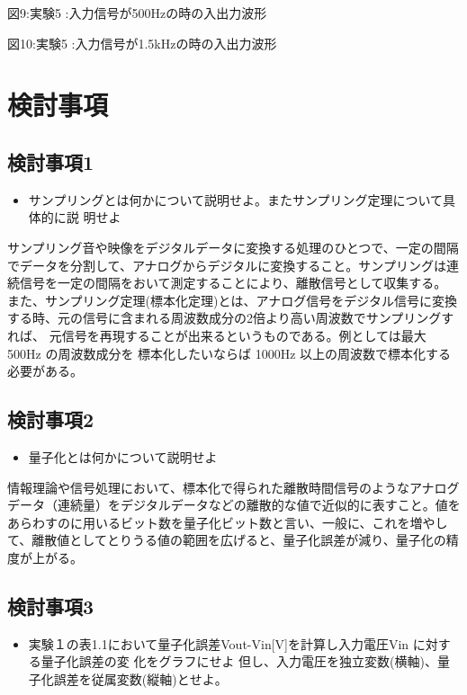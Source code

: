 \documentclass[10pt]{article}
\begin{document}
図9:実験5 :入力信号が500Hzの時の入出力波形
\pagebreak

図10:実験5 :入力信号が1.5kHzの時の入出力波形
\pagebreak

\section{検討事項}

\subsection{検討事項1}

\begin{itemize}
    \item サンプリングとは何かについて説明せよ。またサンプリング定理について具体的に説 明せよ
\end{itemize}

サンプリング音や映像をデジタルデータに変換する処理のひとつで、一定の間隔でデータを分割して、アナログからデジタルに変換すること。サンプリングは連続信号を一定の間隔をおいて測定することにより、離散信号として収集する。
また、サンプリング定理(標本化定理)とは、アナログ信号をデジタル信号に変換する時、元の信号に含まれる周波数成分の2倍より高い周波数でサンプリングすれば、 元信号を再現することが出来るというものである。例としては最大 500Hz の周波数成分を 標本化したいならば 1000Hz 以上の周波数で標本化する必要がある。 

\subsection{検討事項2}

\begin{itemize}
    \item 量子化とは何かについて説明せよ
\end{itemize}

情報理論や信号処理において、標本化で得られた離散時間信号のようなアナログデータ（連続量）をデジタルデータなどの離散的な値で近似的に表すこと。値をあらわすのに用いるビット数を量子化ビット数と言い、一般に、これを増やして、離散値としてとりうる値の範囲を広げると、量子化誤差が減り、量子化の精度が上がる。 

\subsection{検討事項3}

\begin{itemize}
    \item 実験１の表1.1において量子化誤差Vout-Vin[V]を計算し入力電圧Vin に対する量子化誤差の変 化をグラフにせよ 但し、入力電圧を独立変数(横軸)、量子化誤差を従属変数(縦軸)とせよ。 
\end{itemize}
\end{document}
